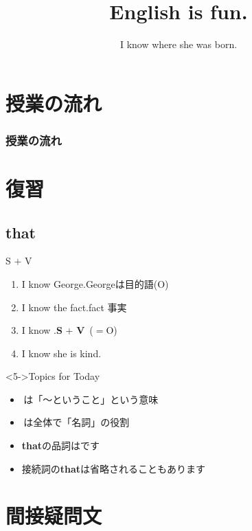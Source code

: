 \documentclass[aspectratio=169,xcolor={dvipsnames,table}]{beamer}
\title{English is fun.}
\subtitle{I know where she was born.}
\author{}
\institute[]{}
\date[]
\begin{document}
\begin{frame}[plain]
  \titlepage
\end{frame}


\section*{授業の流れ}
\begin{frame}[plain]
  \frametitle{授業の流れ}
  \tableofcontents
\end{frame}

\section{復習}
\subsection{that}
\begin{frame}[plain]{S $+$ V }
\large
\begin{enumerate}
 \item<1-> I know George.\hfill{\scriptsize Georgeは目的語(O)}
 \item<2-> I know the fact.\hfill{\scriptsize fact  事実}
 \item<3-> I know .\hfill{}{\small \textbf{S} $+$ \textbf{V}\,\,\,($=$O)}
 \item<4-> I know she is kind.

\end{enumerate}
\mbox{}\hfill{\scriptsize {}}

\begin{block}<5->{Topics for Today}\small
\begin{itemize}[square]\small
 \item   {}\,は「〜ということ」という意味
 \item   {}\,は全体で「名詞」の役割
 \item  \textbf{that}の品詞はです
 \item 接続詞の\textbf{that}は省略されることもあります
\end{itemize}
     \end{block}
\end{frame}
\section{間接疑問文}
\end{document}

